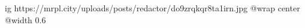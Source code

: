  
 
 
 
 

\ifcmt
  ig https://mrpl.city/uploads/posts/redactor/do9zrqkqr8ta1irn.jpg
  @wrap center
  @width 0.6
\fi
